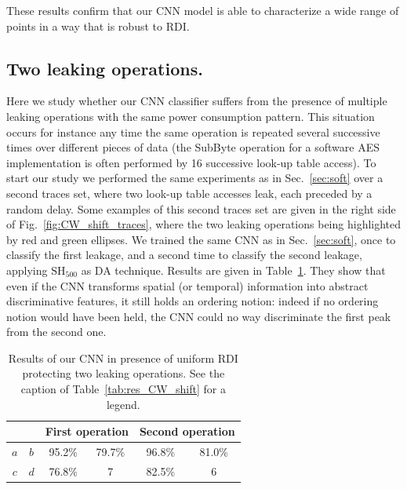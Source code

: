 These results confirm that our CNN model is able to characterize a wide range of points in a way that is robust to RDI. 

\subsection{Two leaking operations.}
Here we study whether our CNN classifier suffers from the presence of multiple leaking operations with the same power consumption pattern. This situation occurs for instance any time the same operation is repeated several successive times over different pieces of data (\eg the SubByte operation for a software AES implementation is often performed by 16 successive look-up table access). To start our study we performed the same experiments as in Sec.~\ref{sec:soft} over a second traces set, where two look-up table accesses leak, each preceded by a random delay. Some examples of this second traces set are given in the right side of Fig.~\ref{fig:CW_shift_traces}, where the two leaking operations being highlighted by red and green ellipses. We trained the same CNN as in Sec.~\ref{sec:soft}, once to classify the first leakage, and a second time to classify the second leakage, applying $\mathrm{SH}_{500}$ as DA technique. Results are given in Table~\ref{tab:label}. They show that even if the CNN transforms spatial (or temporal) information into abstract discriminative features, it still holds an ordering notion: indeed if no ordering notion would have been held, the CNN could no way discriminate the first peak from the second one. 


\begin{table}[]
\centering
\caption{Results of our CNN in presence of uniform RDI protecting two leaking operations. See the caption of Table~\ref{tab:res_CW_shift} for a legend.}
\label{tab:label}
\begin{tabular}{|c|c|c|c|c|c|}
\hline
\multicolumn{2}{|c|}{} & \multicolumn{2}{c|}{First operation} & \multicolumn{2}{c|}{Second operation} \\ \hline
$a$        & $b$       & 95.2\%            & 79.7\%           & 96.8\%            & 81.0\%            \\ \hline
$c$        & $d$       & 76.8\%            & 7                & 82.5\%            & 6                 \\ \hline
\end{tabular}
\end{table}




